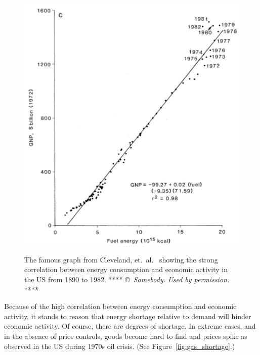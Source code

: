 \begin{figure}[!ht]
\centering\
\includegraphics[width=\linewidth]{Part_0/Chapter_Introduction/images/Cleveland1984.pdf}
\caption[Energy and economic activity]{The famous graph from Cleveland, et.\ al.\
\cite{Cleveland:1984aa} showing the strong correlation 
between energy consumption and economic activity in the US from 1890 to 1982.
**** \copyright~\emph{Somebody. Used by permission.} ****}
\label{fig:Cleveland1984}
\end{figure}

Because of the high correlation between energy consumption and economic activity,
it stands to reason that energy shortage relative to demand will hinder economic activity.
Of course, there are degrees of shortage. 
In extreme cases, and in the absence of price controls,
goods become hard to find and prices spike
as observed in the US during 1970s oil crisis.
(See Figure~\ref{fig:gas_shortage}.)

